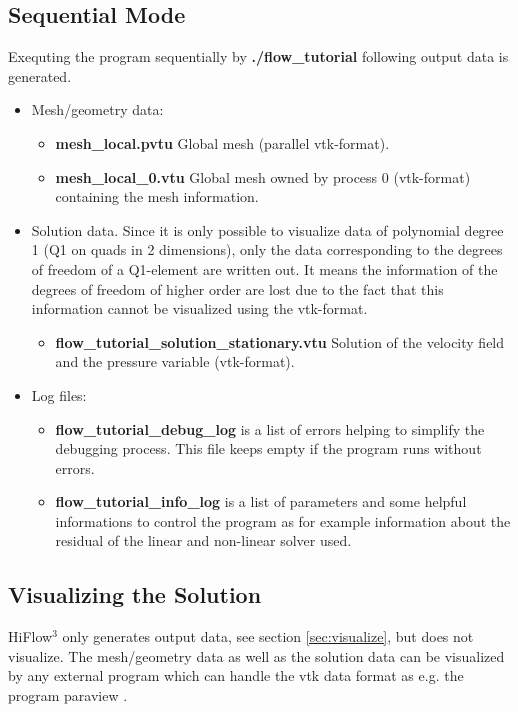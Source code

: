 \documentclass[a4paper, 11pt, twoside]{article}
\begin{document}
\subsection{Sequential Mode}
Exequting the program sequentially by \textbf{./flow\_tutorial} following output data is generated. 
\begin{itemize}
\item Mesh/geometry data:
\begin{itemize}
\item \textbf{mesh\_local.pvtu} Global mesh (parallel vtk-format). 
\item \textbf{mesh\_local\_0.vtu} Global mesh owned by process 0 (vtk-format) containing the mesh information.
\end{itemize}
\item Solution data. Since it is only possible to visualize data of polynomial degree 1 (Q1 on quads in 2 dimensions), only the data corresponding to the degrees of freedom of a Q1-element are written out. It means the information of the degrees of freedom of higher order are lost due to the fact that this information cannot be visualized using the vtk-format.
\begin{itemize}
\item \textbf{flow\_tutorial\_solution\_stationary.vtu} Solution of the velocity field and the pressure variable (vtk-format). 
\end{itemize}
\item Log files:
\begin{itemize}
\item \textbf{flow\_tutorial\_debug\_log} is a list of errors helping to simplify the debugging process. This file keeps empty if the program runs without errors.
\item \textbf{flow\_tutorial\_info\_log} is a list of parameters and some helpful informations to control the program as for example information 
                                         about the residual of the linear and non-linear solver used.
\end{itemize}
\end{itemize}

\subsection{Visualizing the Solution}
HiFlow$^3$ only generates output data, see section \ref{sec:visualize}, but does not visualize. The mesh/geometry data as well as the solution data can be visualized 
by any external program which can handle the vtk data format as e.g. the program paraview \cite{Paraview}. 
\end{document}
